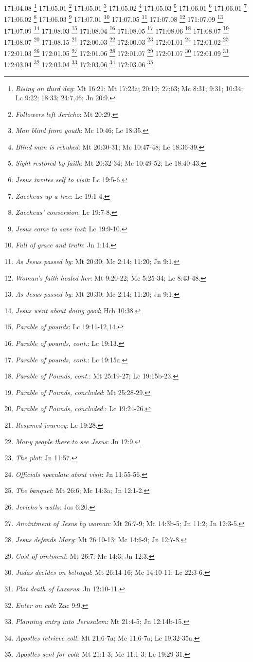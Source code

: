 171:04.08 \footnote{\textit{Rising on third day}: Mt 16:21; Mt 17:23a; 20:19; 27:63; Mc 8:31; 9:31; 10:34; Lc 9:22; 18:33; 24:7,46; Jn 20:9.}
171:05.01 \footnote{\textit{Followers left Jericho}: Mt 20:29.}
171:05.01 \footnote{\textit{Man blind from youth}: Mc 10:46; Lc 18:35.}
171:05.02 \footnote{\textit{Blind man is rebuked}: Mt 20:30-31; Mc 10:47-48; Lc 18:36-39.}
171:05.03 \footnote{\textit{Sight restored by faith}: Mt 20:32-34; Mc 10:49-52; Lc 18:40-43.}
171:06.01 \footnote{\textit{Jesus invites self to visit}: Lc 19:5-6.}
171:06.01 \footnote{\textit{Zaccheus up a tree}: Lc 19:1-4.}
171:06.02 \footnote{\textit{Zaccheus' conversion}: Lc 19:7-8.}
171:06.03 \footnote{\textit{Jesus came to save lost}: Lc 19:9-10.}
171:07.01 \footnote{\textit{Full of grace and truth}: Jn 1:14.}
171:07.05 \footnote{\textit{As Jesus passed by}: Mt 20:30; Mc 2:14; 11:20; Jn 9:1.}
171:07.08 \footnote{\textit{Woman's faith healed her}: Mt 9:20-22; Mc 5:25-34; Lc 8:43-48.}
171:07.09 \footnote{\textit{As Jesus passed by}: Mt 20:30; Mc 2:14; 11:20; Jn 9:1.}
171:07.09 \footnote{\textit{Jesus went about doing good}: Hch 10:38.}
171:08.03 \footnote{\textit{Parable of pounds}: Lc 19:11-12,14.}
171:08.04 \footnote{\textit{Parable of pounds, cont.}: Lc 19:13.}
171:08.05 \footnote{\textit{Parable of pounds, cont.}: Lc 19:15a.}
171:08.06 \footnote{\textit{Parable of Pounds, cont.}: Mt 25:19-27; Lc 19:15b-23.}
171:08.07 \footnote{\textit{Parable of Pounds, concluded}: Mt 25:28-29.}
171:08.07 \footnote{\textit{Parable of Pounds, concluded.}: Lc 19:24-26.}
171:08.15 \footnote{\textit{Resumed journey}: Lc 19:28.}
172:00.03 \footnote{\textit{Many people there to see Jesus}: Jn 12:9.}
172:00.03 \footnote{\textit{The plot}: Jn 11:57.}
172:01.01 \footnote{\textit{Officials speculate about visit}: Jn 11:55-56.}
172:01.02 \footnote{\textit{The banquet}: Mt 26:6; Mc 14:3a; Jn 12:1-2.}
172:01.03 \footnote{\textit{Jericho's walls}: Jos 6:20.}
172:01.05 \footnote{\textit{Anointment of Jesus by woman}: Mt 26:7-9; Mc 14:3b-5; Jn 11:2; Jn 12:3-5.}
172:01.06 \footnote{\textit{Jesus defends Mary}: Mt 26:10-13; Mc 14:6-9; Jn 12:7-8.}
172:01.07 \footnote{\textit{Cost of ointment}: Mt 26:7; Mc 14:3; Jn 12:3.}
172:01.07 \footnote{\textit{Judas decides on betrayal}: Mt 26:14-16; Mc 14:10-11; Lc 22:3-6.}
172:01.09 \footnote{\textit{Plot death of Lazarus}: Jn 12:10-11.}
172:03.04 \footnote{\textit{Enter on colt}: Zac 9:9.}
172:03.04 \footnote{\textit{Planning entry into Jerusalem}: Mt 21:4-5; Jn 12:14b-15.}
172:03.06 \footnote{\textit{Apostles retrieve colt}: Mt 21:6-7a; Mc 11:6-7a; Lc 19:32-35a.}
172:03.06 \footnote{\textit{Apostles sent for colt}: Mt 21:1-3; Mc 11:1-3; Lc 19:29-31.}
